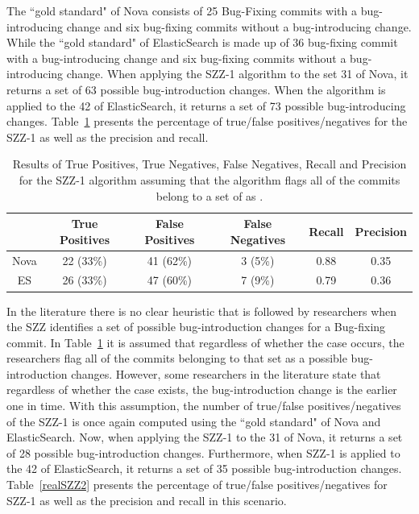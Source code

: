 \documentclass[a4paper, 12pt]{book}
\begin{document}
The ``gold standard" of Nova consists of 25 Bug-Fixing commits with a bug-introducing change and six bug-fixing commits without a bug-introducing change. While the ``gold standard" of ElasticSearch is made up of 36 bug-fixing commit with a bug-introducing change and six bug-fixing commits without a bug-introducing change. When applying the SZZ-1 algorithm to the set 31 \BFC of Nova, it returns a set of 63 possible bug-introduction changes. When the algorithm is applied to the 42 \BFC of ElasticSearch, it returns a set of 73 possible bug-introducing changes. Table~\ref{realSZZ} presents the percentage of true/false positives/negatives for the SZZ-1 as well as the precision and recall.

\begin{table}[!t]
	\renewcommand{\arraystretch}{1.3}
	\caption{Results of True Positives, True Negatives, False Negatives, Recall and Precision for the SZZ-1 algorithm assuming that the algorithm flags all of the commits belong to a set of  as \BIC.}
	\label{realSZZ}
	\centering
	\begin{tabular}{|c|c|c|c|c|c|}
		\hline
 	 	&  True Positives & False Positives & False Negatives & Recall & Precision \\
		\hline
		\hline
		Nova & 22 (33\%) & 41 (62\%) & 3 (5\%) & 0.88 & 0.35\\
		\hline
		ES &  26 (33\%) & 47 (60\%) & 7 (9\%)& 0.79 & 0.36 \\
		\hline
	\end{tabular}
\end{table}

In the literature there is no clear heuristic that is followed by researchers when the SZZ identifies a set of possible bug-introduction changes for a Bug-fixing commit. In Table~\ref{realSZZ} it is assumed that regardless of whether the case occurs, the researchers flag all of the commits belonging to that set as a possible bug-introduction changes. However, some researchers in the literature state that regardless of whether the case exists, the bug-introduction change is the earlier one in time. With this assumption, the number of true/false positives/negatives of the SZZ-1 is once again computed using the ``gold standard" of Nova and ElasticSearch. Now, when applying the SZZ-1 to the 31 \BFC of Nova, it returns a set of 28 possible bug-introduction changes. Furthermore, when SZZ-1 is applied to the 42 \BFC of ElasticSearch, it returns a set of 35 possible bug-introduction changes. Table~\ref{realSZZ2} presents the percentage of true/false positives/negatives for SZZ-1 as well as the precision and recall in this scenario.
\end{document}
